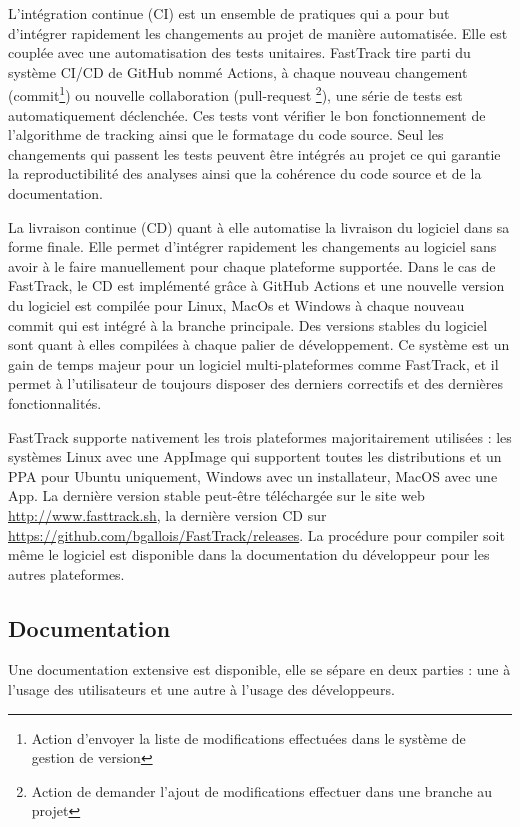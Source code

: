 		L'intégration continue (CI) est un ensemble de pratiques qui a pour but d'intégrer rapidement les changements au projet de manière automatisée. Elle est couplée avec une automatisation des tests unitaires. FastTrack tire parti du système CI/CD de GitHub nommé Actions, à chaque nouveau changement (commit\footnote{Action d'envoyer la liste de modifications effectuées dans le système de gestion de version}) ou nouvelle collaboration (pull-request \footnote{Action de demander l'ajout de modifications effectuer dans une branche au projet}), une série de tests est automatiquement déclenchée. Ces tests vont vérifier le bon fonctionnement de l'algorithme de tracking ainsi que le formatage du code source. Seul les changements qui passent les tests peuvent être intégrés au projet ce qui garantie la reproductibilité des analyses ainsi que la cohérence du code source et de la documentation.
\medbreak
		
		La livraison continue (CD) quant à elle automatise la livraison du logiciel dans sa forme finale. Elle permet d'intégrer rapidement les changements au logiciel sans avoir à le faire manuellement pour chaque plateforme supportée. Dans le cas de FastTrack, le CD est implémenté grâce à GitHub Actions et une nouvelle version du logiciel est compilée pour Linux, MacOs et Windows à chaque nouveau commit qui est intégré à la branche principale. Des versions stables du logiciel sont quant à elles compilées à chaque palier de développement. Ce système est un gain de temps majeur pour un logiciel multi-plateformes comme FastTrack, et il permet à l'utilisateur de toujours disposer des derniers correctifs et des dernières fonctionnalités.
\medbreak
		
		FastTrack supporte nativement les trois plateformes majoritairement utilisées : les systèmes Linux avec une AppImage qui supportent toutes les distributions et un PPA pour Ubuntu uniquement, Windows avec un installateur, MacOS avec une App. La dernière version stable peut-être téléchargée sur le site web \url{http://www.fasttrack.sh}, la dernière version CD sur \url{https://github.com/bgallois/FastTrack/releases}. La procédure pour compiler soit même le logiciel est disponible dans la documentation du développeur pour les autres plateformes.
		
		\subsection{Documentation}
		Une documentation extensive est disponible, elle se sépare en deux parties : une à l'usage des utilisateurs et une autre à l'usage des développeurs.
		
